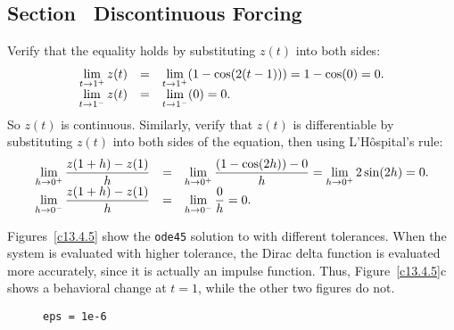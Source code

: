 \subsection*{Section~\protect{\ref{S:13.4}} Discontinuous Forcing}

 Verify that the equality holds by substituting $z(t)$ into
both sides:
\[
\begin{array}{rcl}
\displaystyle \lim_{t \rightarrow 1^{+}}z(t) & = &
\displaystyle \lim_{t \rightarrow 1^{+}}(1 - \cos(2(t - 1))) = 1 - \cos(0) = 0. \\
\displaystyle \lim_{t \rightarrow 1^{-}}z(t) & = &
\displaystyle \lim_{t \rightarrow 1^{-}}(0) = 0.
\end{array}
\]
So $z(t)$ is continuous.  Similarly, verify that $z(t)$ is differentiable
by substituting $z(t)$ into both sides of the equation, then using
L'H\^{o}spital's rule:
\[
\begin{array}{rcl}
\displaystyle \lim_{h \rightarrow 0^{+}}\frac{z(1 + h) - z(1)}{h}
& = & \displaystyle \lim_{h \rightarrow 0^{+}}\frac{(1 - \cos(2h)) - 0}{h}
= \displaystyle \lim_{h \rightarrow 0^{+}}2\sin(2h) = 0. \\
\displaystyle \lim_{h \rightarrow 0^{-}}\frac{z(1 + h) - z(1)}{h}
& = & \displaystyle \lim_{h \rightarrow 0^{-}}\frac{0}{h} = 0.
\end{array}
\]

 \ans Figures~\ref{c13.4.5} show the {\tt ode45} solution
to  with different tolerances.  When the system is
evaluated with higher tolerance, the Dirac delta function is evaluated
more accurately, since it is actually an impulse function.  Thus,
Figure~\ref{c13.4.5}c shows a behavioral change at $t = 1$, while the
other two figures do not.

\begin{figure}[htb]
                       \centerline{%
                       }
                \centerline{{\tt eps = 1e-6}\hspace{1.2in}{\tt eps = 1e-8}
\hspace{1.2in}{\tt eps = 1e-10}}
\end{figure}


